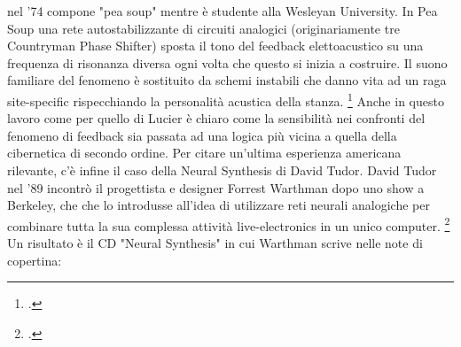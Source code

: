 nel '74 compone "pea soup" mentre è studente alla Wesleyan University.
In Pea Soup una rete autostabilizzante di circuiti analogici
(originariamente tre Countryman Phase Shifter)
sposta il tono del feedback elettoacustico su una frequenza di risonanza
diversa ogni volta che questo si inizia a
costruire. Il suono familiare del fenomeno è sostituito da schemi instabili
che danno vita ad un raga site-specific
rispecchiando la personalità acustica della stanza. \footcite{collinspeasouphist}
Anche in questo lavoro come per quello di Lucier è chiaro come la sensibilità
nei confronti del fenomeno di feedback sia passata ad una logica più vicina
a quella della cibernetica di secondo ordine.
Per citare un'ultima esperienza americana rilevante,
c'è infine il caso della Neural Synthesis di David Tudor.
David Tudor nel '89 incontrò il progettista e designer Forrest Warthman
dopo uno show a Berkeley,
che che lo introdusse all'idea di utilizzare reti neurali analogiche
per combinare tutta la sua complessa attività live-electronics in un unico computer.
\footcite{tudorneuralsynth}
Un risultato è il CD "Neural Synthesis" in cui Warthman scrive nelle note di copertina:

